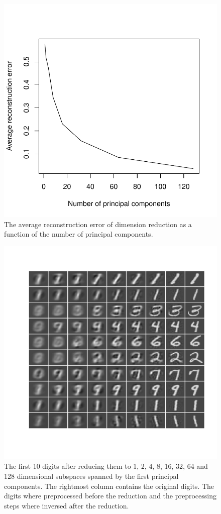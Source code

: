 \documentclass{article}
\begin{document}
\begin{figure}\centering
	\includegraphics[scale=0.5]{error}
	\caption{The average reconstruction error of dimension reduction as a function of the number of principal components.}\label{fig:avgerr}
\end{figure}
\begin{figure}\centering
	\includegraphics[scale=\sscale]{digitreduce}
	\caption{The first 10 digits after reducing them to 1, 2, 4, 8, 16, 32, 64 and 128 dimensional subspaces spanned by the first principal components.
The rightmost column contains the original digits.
The digits where preprocessed before the reduction and the preprocessing steps where inversed after the reduction.}\label{fig:reduce}
\end{figure}
\end{document}
